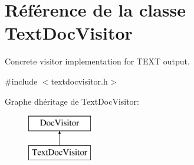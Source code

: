 \hypertarget{class_text_doc_visitor}{}\section{Référence de la classe Text\+Doc\+Visitor}
\label{class_text_doc_visitor}


Concrete visitor implementation for T\+E\+X\+T output.  




{\ttfamily \#include $<$textdocvisitor.\+h$>$}

Graphe d\textquotesingle{}héritage de Text\+Doc\+Visitor\+:\begin{figure}[H]
\begin{center}
\leavevmode
\includegraphics[height=2.000000cm]{class_text_doc_visitor}
\end{center}
\end{figure}
